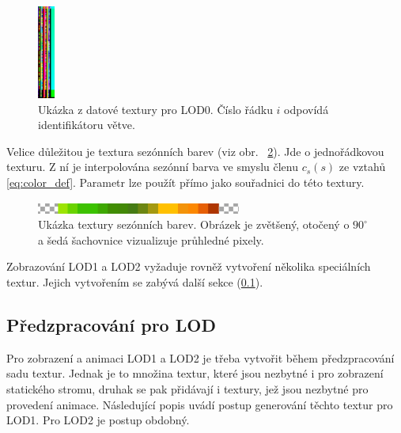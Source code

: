\begin{figure}[!hbt]
\begin{center}
\includegraphics[width=0.05\textwidth]{./figures/branchDataTextureLOD0.png}
\end{center}
\caption[Ukázka z datové textury pro LOD0]%
{Ukázka z datové textury pro LOD0. Číslo řádku $i$ odpovídá identifikátoru větve.\label{fig:branchDataTextureLOD0}
}
\end{figure}
Velice důležitou je textura sezónních barev (viz obr. ~\ref{fig:seasonMap}). Jde o jednořádkovou texturu. Z ní je interpolována sezónní barva ve smyslu členu $c_s(s)$ ze vztahů \eqref{eq:color_def}. Parametr  lze použít přímo jako souřadnici do této textury. 
\begin{figure}[!hbt]
\begin{center}
\includegraphics[width=0.6\textwidth]{./figures/seasonTex.png}
\end{center}
\caption[Ukázka textury sezónních barev]%
{Ukázka textury sezónních barev. Obrázek je zvětšený, otočený o $90^{\circ}$ a šedá šachovnice vizualizuje průhledné pixely.\label{fig:seasonMap}
}
\end{figure}

Zobrazování LOD1 a LOD2 vyžaduje rovněž vytvoření několika speciálních textur. Jejich vytvořením se zabývá další sekce (\ref{sec:preprocessLOD}).

\pagebreak
\subsection{Předzpracování pro LOD}
\label{sec:preprocessLOD}
Pro zobrazení a animaci LOD1 a LOD2 je třeba vytvořit během předzpracování sadu textur. Jednak je to množina textur, které jsou nezbytné i pro zobrazení statického stromu, druhak se pak přidávají i textury, jež jsou nezbytné pro provedení animace. Následující popis uvádí postup generování těchto textur pro LOD1. Pro LOD2 je postup obdobný.

